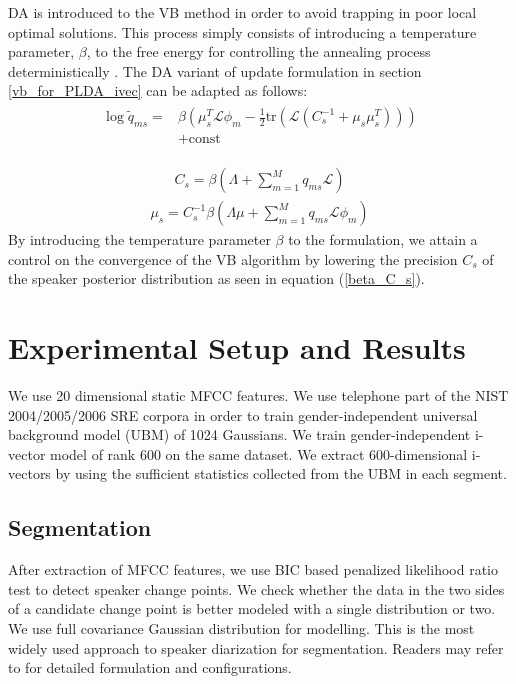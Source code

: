 \documentclass{article}
\begin{document}
DA is introduced to the VB method in order to avoid trapping in poor local optimal solutions. This process simply consists of introducing a temperature parameter, $\beta$, to the free energy for controlling the annealing process deterministically \cite{katahira2008DAVB}. The DA variant of update formulation in section \ref{vb_for_PLDA_ivec} can be adapted as follows: 
\begin{eqnarray}
\begin{split}
\log \tilde{q}_{ms}= &\beta(\mu_s^T\mathcal{L}\phi_m-\frac{1}{2}\mathrm{tr}(\mathcal{L}(C_s^{-1}+\mu_s\mu_s^T))) \\
                     &+\mbox{const}
\end{split}
\label{bete_q_ms}
\end{eqnarray}

\begin{eqnarray}
C_s=\beta(\Lambda+\sum_{m=1}^{M}q_{ms}\mathcal{L})
\label{beta_C_s}
\end{eqnarray}
\begin{eqnarray}
\mu_s=C_s^{-1}\beta(\Lambda\mu+\sum_{m=1}^{M}q_{ms}\mathcal{L}\phi_m)
\label{beta_mu_s}
\end{eqnarray}
By introducing the temperature parameter $\beta$ to the formulation, we attain a control on the convergence of the VB algorithm by lowering the precision $C_s$ of the speaker posterior distribution as seen in equation (\ref{beta_C_s}). 

\section{Experimental Setup and Results}
\label{sec:exp}

We use 20 dimensional static MFCC features. We use telephone part of the NIST 2004/2005/2006 SRE corpora in order to train gender-independent universal background model (UBM) of 1024 Gaussians. We train gender-independent i-vector model of rank 600 on the same dataset. We extract 600-dimensional i-vectors by using the sufficient statistics collected from the UBM in each segment.

\subsection{Segmentation}

After extraction of MFCC features, we use BIC based penalized likelihood ratio test to detect speaker change points. We check whether the data in the two sides of a candidate change point is better modeled with a single distribution or two. We use full covariance Gaussian distribution for modelling. This is the most widely used approach to speaker diarization for segmentation. Readers may refer to \cite{mit2004diarization} for detailed formulation and configurations.
\end{document}
